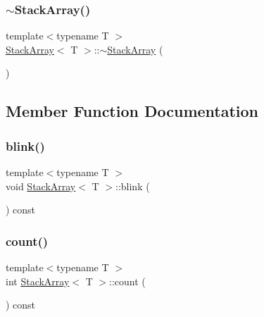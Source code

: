 \mbox{\label{class_stack_array_a1e0a11a247341ce75f2f0e44c5f40581}} 
\subsubsection{\texorpdfstring{$\sim$\+Stack\+Array()}{~StackArray()}}
{\footnotesize\ttfamily template$<$typename T $>$ \\
\mbox{\hyperlink{class_stack_array}{Stack\+Array}}$<$ T $>$\+::$\sim$\mbox{\hyperlink{class_stack_array}{Stack\+Array}} (\begin{DoxyParamCaption}{ }\end{DoxyParamCaption})}



\subsection{Member Function Documentation}
\mbox{\label{class_stack_array_a3f1d4f8e8bc52b5dfea459b57c40af41}} 
\subsubsection{\texorpdfstring{blink()}{blink()}}
{\footnotesize\ttfamily template$<$typename T $>$ \\
void \mbox{\hyperlink{class_stack_array}{Stack\+Array}}$<$ T $>$\+::blink (\begin{DoxyParamCaption}{ }\end{DoxyParamCaption}) const\hspace{0.3cm}{\ttfamily [private]}}

\mbox{\label{class_stack_array_a42cd43082e2c069f31002c54808a8876}} 
\subsubsection{\texorpdfstring{count()}{count()}}
{\footnotesize\ttfamily template$<$typename T $>$ \\
int \mbox{\hyperlink{class_stack_array}{Stack\+Array}}$<$ T $>$\+::count (\begin{DoxyParamCaption}{ }\end{DoxyParamCaption}) const}

